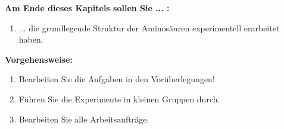 \documentclass{scrartcl}  %
\begin{document}
		\begin{minipage}{0.7\textwidth}
			\noindent \textbf{Am Ende dieses Kapitels sollen Sie ... :}
			\begin{enumerate}
				\item ... die grundlegende Struktur der Aminosäuren experimentell erarbeitet haben.
			\end{enumerate}
			\textbf{Vorgehensweise:}
			\begin{enumerate}
				\item Bearbeiten Sie die Aufgaben in den Vorüberlegungen!
				\item Führen Sie die Experimente in kleinen Gruppen durch.
				\item Bearbeiten Sie alle Arbeitsaufträge.
			\end{enumerate}
			
		\end{minipage}
		\hspace{0.1\textwidth}
\end{document}
